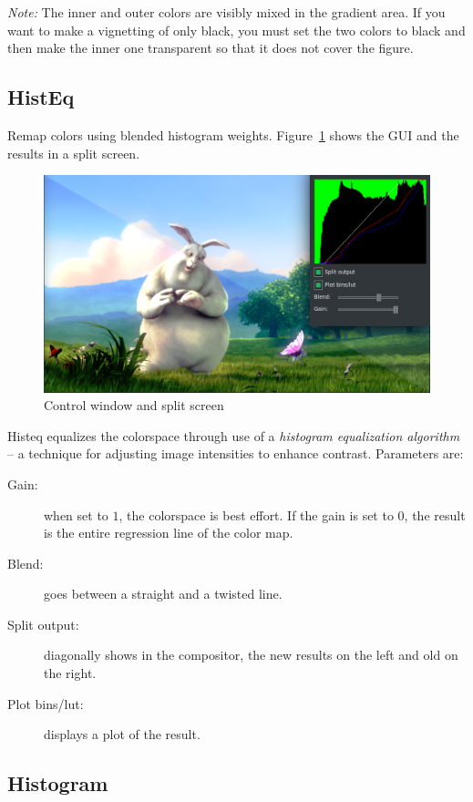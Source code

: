 \textit{Note:} The inner and outer colors are visibly mixed in the gradient area. If you want to make a vignetting of only black, you must set the two colors to black and then make the inner one transparent so that it does not cover the figure.

\subsection{HistEq}%
\label{sub:histeq}

Remap colors using blended histogram weights. Figure~\ref{fig:histeq} shows the GUI and the results in a split screen.

\begin{figure}[htpb]
    \centering
    \includegraphics[width=0.8\linewidth]{images/histeq.png}
    \caption{Control window and split screen}
    \label{fig:histeq}
\end{figure}

Histeq equalizes the colorspace through use of a \textit{histogram equalization algorithm} -- a technique for adjusting image intensities to enhance contrast. Parameters are:

\begin{description}
    \item[Gain:] when set to $1$, the colorspace is best effort. If the gain is set to $0$, the result is the entire regression line of the color map.
    \item[Blend:] goes between a straight and a twisted line.
    \item[Split output:] diagonally shows in the compositor, the new results on the left and old on the right.
    \item[Plot bins/lut:] displays a plot of the result.
\end{description}

\subsection{Histogram}%
\label{sub:histogram}

